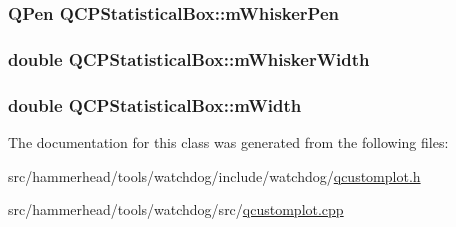\subsubsection[{\texorpdfstring{m\+Whisker\+Pen}{mWhiskerPen}}]{\setlength{\rightskip}{0pt plus 5cm}Q\+Pen Q\+C\+P\+Statistical\+Box\+::m\+Whisker\+Pen\hspace{0.3cm}{\ttfamily [protected]}}\hypertarget{classQCPStatisticalBox_a25b7552499f0f090fcff02858b2265a5}{}\label{classQCPStatisticalBox_a25b7552499f0f090fcff02858b2265a5}
\subsubsection[{\texorpdfstring{m\+Whisker\+Width}{mWhiskerWidth}}]{\setlength{\rightskip}{0pt plus 5cm}double Q\+C\+P\+Statistical\+Box\+::m\+Whisker\+Width\hspace{0.3cm}{\ttfamily [protected]}}\hypertarget{classQCPStatisticalBox_a4d166474f845d5db626e8b11a0815a6f}{}\label{classQCPStatisticalBox_a4d166474f845d5db626e8b11a0815a6f}
\subsubsection[{\texorpdfstring{m\+Width}{mWidth}}]{\setlength{\rightskip}{0pt plus 5cm}double Q\+C\+P\+Statistical\+Box\+::m\+Width\hspace{0.3cm}{\ttfamily [protected]}}\hypertarget{classQCPStatisticalBox_af365e40b0f706c3d76f857c7957f629d}{}\label{classQCPStatisticalBox_af365e40b0f706c3d76f857c7957f629d}


The documentation for this class was generated from the following files\+:\begin{DoxyCompactItemize}
\item 
src/hammerhead/tools/watchdog/include/watchdog/\hyperlink{qcustomplot_8h}{qcustomplot.\+h}\item 
src/hammerhead/tools/watchdog/src/\hyperlink{qcustomplot_8cpp}{qcustomplot.\+cpp}\end{DoxyCompactItemize}
